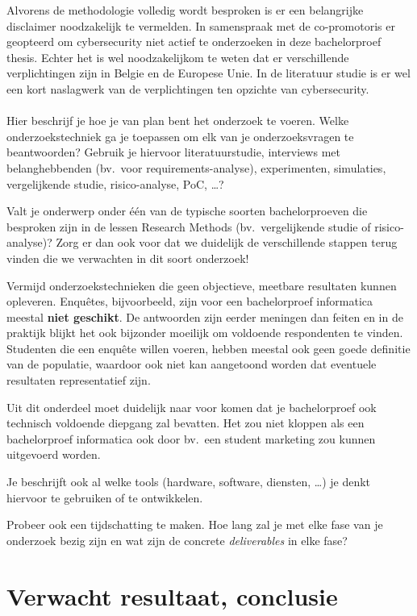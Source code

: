 Alvorens de methodologie volledig wordt besproken is er een belangrijke disclaimer noodzakelijk te vermelden.
In samenspraak met de co-promotoris er geopteerd om cybersecurity niet actief te onderzoeken in deze bachelorproef thesis. Echter het is wel noodzakelijkom te weten dat er verschillende verplichtingen zijn in Belgie en de Europese Unie. In de literatuur studie is er wel een kort naslagwerk van de verplichtingen ten opzichte van cybersecurity.
\\\\
Hier beschrijf je hoe je van plan bent het onderzoek te voeren. Welke onderzoekstechniek ga je toepassen om elk van je onderzoeksvragen te beantwoorden? Gebruik je hiervoor literatuurstudie, interviews met belanghebbenden (bv.~voor requirements-analyse), experimenten, simulaties, vergelijkende studie, risico-analyse, PoC, \ldots?

Valt je onderwerp onder één van de typische soorten bachelorproeven die besproken zijn in de lessen Research Methods (bv.\ vergelijkende studie of risico-analyse)? Zorg er dan ook voor dat we duidelijk de verschillende stappen terug vinden die we verwachten in dit soort onderzoek!

Vermijd onderzoekstechnieken die geen objectieve, meetbare resultaten kunnen opleveren. Enquêtes, bijvoorbeeld, zijn voor een bachelorproef informatica meestal \textbf{niet geschikt}. De antwoorden zijn eerder meningen dan feiten en in de praktijk blijkt het ook bijzonder moeilijk om voldoende respondenten te vinden. Studenten die een enquête willen voeren, hebben meestal ook geen goede definitie van de populatie, waardoor ook niet kan aangetoond worden dat eventuele resultaten representatief zijn.

Uit dit onderdeel moet duidelijk naar voor komen dat je bachelorproef ook technisch voldoen\-de diepgang zal bevatten. Het zou niet kloppen als een bachelorproef informatica ook door bv.\ een student marketing zou kunnen uitgevoerd worden.

Je beschrijft ook al welke tools (hardware, software, diensten, \ldots) je denkt hiervoor te gebruiken of te ontwikkelen.

Probeer ook een tijdschatting te maken. Hoe lang zal je met elke fase van je onderzoek bezig zijn en wat zijn de concrete \emph{deliverables} in elke fase?

\section{Verwacht resultaat, conclusie}%
\label{sec:verwachte_resultaten}

